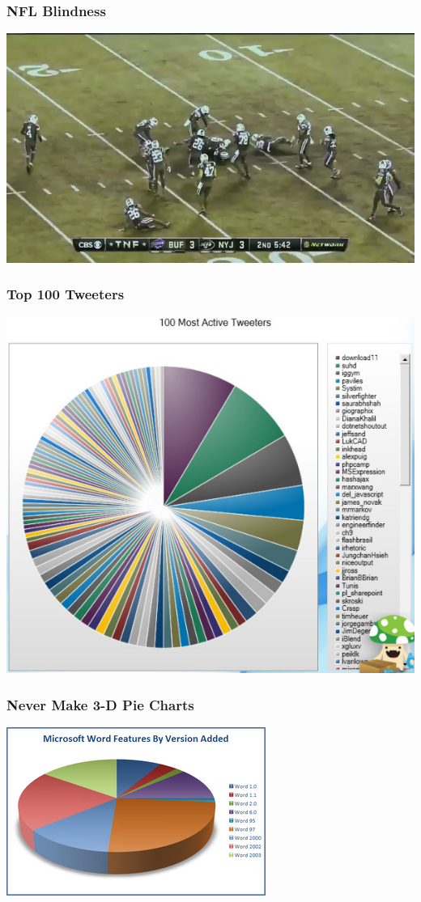 \documentclass{beamer} %
\begin{document}
\begin{frame}\frametitle{NFL Blindness}
	\centering
	\includegraphics[width=\linewidth]{nfl2.jpg}
\end{frame}

\begin{frame}\frametitle{Top 100 Tweeters}
	\centering
	\includegraphics[width=0.77\linewidth]{tweet.jpg}
\end{frame}


\begin{frame}\frametitle{Never Make 3-D Pie Charts}
	\centering
	\includegraphics[width=0.87\linewidth]{3dpie.png}
\end{frame}
\end{document}
